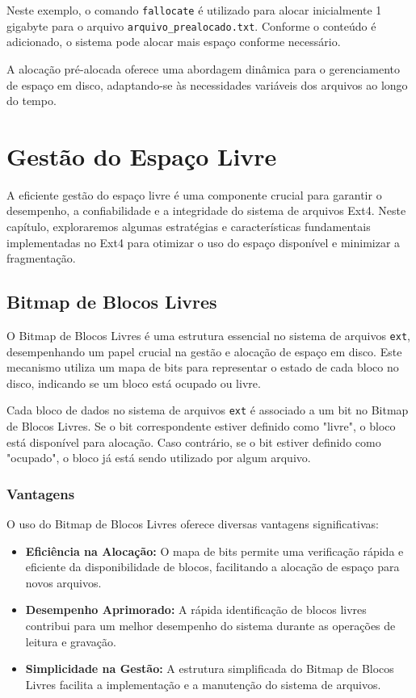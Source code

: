\documentclass[
	12pt,				%
	openright,			%
	oneside,			%
	a4paper,			%
	chapter=TITLE,		%
	english,			%
	french,				%
	spanish,			%
	brazil				%
	]{abntex2}
\theoremstyle{definition}
\begin{document}
Neste exemplo, o comando \texttt{fallocate} é utilizado para alocar inicialmente 1 gigabyte para o arquivo \texttt{arquivo\_prealocado.txt}. Conforme o conteúdo é adicionado, o sistema pode alocar mais espaço conforme necessário.

A alocação pré-alocada oferece uma abordagem dinâmica para o gerenciamento de espaço em disco, adaptando-se às necessidades variáveis dos arquivos ao longo do tempo.

\chapter{Gestão do Espaço Livre}

A eficiente gestão do espaço livre é uma componente crucial para garantir o desempenho, a confiabilidade e a 
integridade do sistema de arquivos Ext4. Neste capítulo, exploraremos algumas estratégias e características 
fundamentais implementadas no Ext4 para otimizar o uso do espaço disponível e minimizar a fragmentação.

\section{Bitmap de Blocos Livres}

O Bitmap de Blocos Livres é uma estrutura essencial no sistema de arquivos \texttt{ext}, desempenhando um papel crucial na gestão e alocação de espaço em disco. Este mecanismo utiliza um mapa de bits para representar o estado de cada bloco no disco, indicando se um bloco está ocupado ou livre.

Cada bloco de dados no sistema de arquivos \texttt{ext} é associado a um bit no Bitmap de Blocos Livres. Se o bit correspondente estiver definido como "livre", o bloco está disponível para alocação. Caso contrário, se o bit estiver definido como "ocupado", o bloco já está sendo utilizado por algum arquivo.

\subsection{Vantagens}
O uso do Bitmap de Blocos Livres oferece diversas vantagens significativas:

\begin{itemize}
    \item \textbf{Eficiência na Alocação:} O mapa de bits permite uma verificação rápida e eficiente da disponibilidade de blocos, facilitando a alocação de espaço para novos arquivos.
    
    \item \textbf{Desempenho Aprimorado:} A rápida identificação de blocos livres contribui para um melhor desempenho do sistema durante as operações de leitura e gravação.
    
    \item \textbf{Simplicidade na Gestão:} A estrutura simplificada do Bitmap de Blocos Livres facilita a implementação e a manutenção do sistema de arquivos.
\end{itemize}
\end{document}

